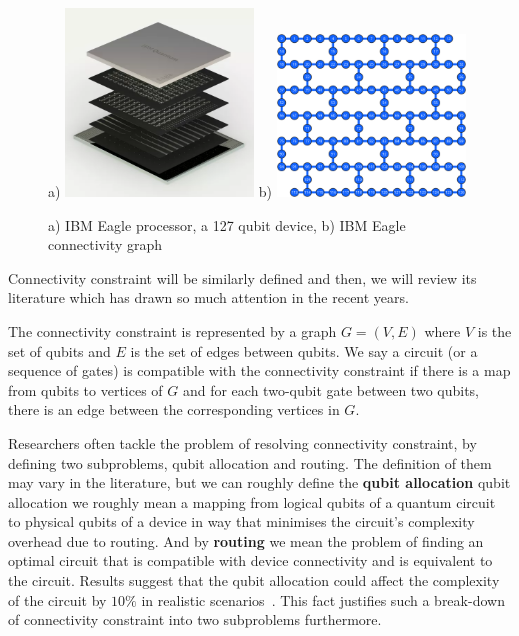\begin{figure}[h!]
  \centering
  a) \includegraphics*[width=5cm]{shapes/ibm_dev}
  b) \includegraphics*[width=5cm]{shapes/ibm_conn}
  \caption{a) IBM Eagle processor, a 127 qubit device, b) IBM Eagle connectivity graph \cite{ibm2021}}
  \label{fig:connectivity}
\end{figure}

Connectivity constraint will be similarly defined and then, we will review its literature which has drawn so much attention in the recent years.

\begin{definition}
  The connectivity constraint is represented by a graph $G = (V, E)$ where $V$ is the set of qubits and $E$ is the set of edges between qubits. We say a circuit (or a sequence of gates) is compatible with the connectivity constraint if there is a map from qubits to vertices of $G$ and for each two-qubit gate between two qubits, there is an edge between the corresponding vertices in $G$.
\end{definition}

Researchers often tackle the problem of resolving connectivity constraint, by defining two subproblems, qubit allocation and routing. The definition of them may vary in the literature, but we can roughly define the \textbf{qubit allocation} qubit allocation we roughly mean a mapping from logical qubits of a quantum circuit to physical qubits of a device in way that minimises the circuit's complexity overhead due to routing. And by \textbf{routing} we mean the problem of finding an optimal circuit that is compatible with device connectivity and is equivalent to the circuit. Results suggest that the qubit allocation could affect the complexity of the circuit by $10\%$ in realistic scenarios~\cite{paler2019}. This fact justifies such a break-down of connectivity constraint into two subproblems furthermore.

